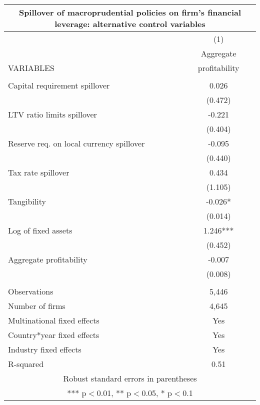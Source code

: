 \begin{tabular}{lc}
\multicolumn{2}{c}{Spillover of macroprudential policies on firm's financial leverage: alternative control variables} \\ \hline
 & (1) \\
 & Aggregate \\
VARIABLES & profitability \\ \hline
 &  \\
Capital requirement spillover & 0.026 \\
 & (0.472) \\
LTV ratio limits spillover & -0.221 \\
 & (0.404) \\
Reserve req. on local currency spillover & -0.095 \\
 & (0.440) \\
Tax rate spillover & 0.434 \\
 & (1.105) \\
Tangibility & -0.026* \\
 & (0.014) \\
Log of fixed assets & 1.246*** \\
 & (0.452) \\
Aggregate profitability & -0.007 \\
 & (0.008) \\
 &  \\
Observations & 5,446 \\
Number of firms & 4,645 \\
Multinational fixed effects & Yes \\
Country*year fixed effects & Yes \\
Industry fixed effects & Yes \\
 R-squared & 0.51 \\ \hline
\multicolumn{2}{c}{ Robust standard errors in parentheses} \\
\multicolumn{2}{c}{ *** p$<$0.01, ** p$<$0.05, * p$<$0.1} \\
\end{tabular}

